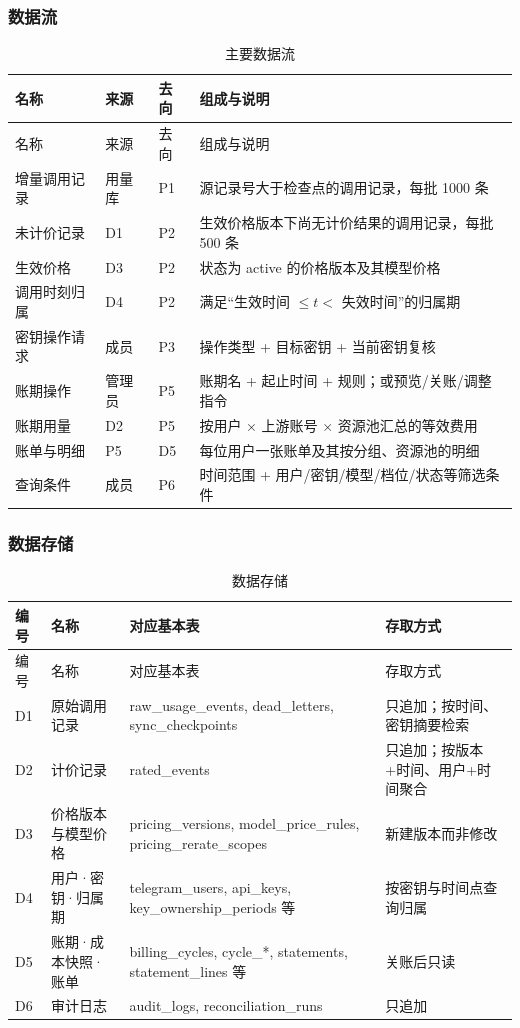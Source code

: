\subsubsection{数据流}

\begin{longtable}{@{}p{}p{}p{}p{}@{}}
\caption{主要数据流}\\
\toprule 名称 & 来源 & 去向 & 组成与说明 \\ \midrule\endfirsthead
\toprule 名称 & 来源 & 去向 & 组成与说明 \\ \midrule\endhead
增量调用记录 & 用量库 & P1 & 源记录号大于检查点的调用记录，每批 1000 条 \\
未计价记录 & D1 & P2 & 生效价格版本下尚无计价结果的调用记录，每批 500 条 \\
生效价格 & D3 & P2 & 状态为 active 的价格版本及其模型价格 \\
调用时刻归属 & D4 & P2 & 满足“生效时间 $\le t <$ 失效时间”的归属期 \\
密钥操作请求 & 成员 & P3 & 操作类型 + 目标密钥 + 当前密钥复核 \\
账期操作 & 管理员 & P5 & 账期名 + 起止时间 + 规则；或预览/关账/调整指令 \\
账期用量 & D2 & P5 & 按用户 × 上游账号 × 资源池汇总的等效费用 \\
账单与明细 & P5 & D5 & 每位用户一张账单及其按分组、资源池的明细 \\
查询条件 & 成员 & P6 & 时间范围 + 用户/密钥/模型/档位/状态等筛选条件 \\
\bottomrule
\end{longtable}

\subsubsection{数据存储}

\begin{longtable}{@{}p{}p{}p{}p{}@{}}
\caption{数据存储}\\
\toprule 编号 & 名称 & 对应基本表 & 存取方式 \\ \midrule\endfirsthead
\toprule 编号 & 名称 & 对应基本表 & 存取方式 \\ \midrule\endhead
D1 & 原始调用记录 & raw\_usage\_events, dead\_letters, sync\_checkpoints & 只追加；按时间、密钥摘要检索 \\
D2 & 计价记录 & rated\_events & 只追加；按版本+时间、用户+时间聚合 \\
D3 & 价格版本与模型价格 & pricing\_versions, model\_price\_rules, pricing\_rerate\_scopes & 新建版本而非修改 \\
D4 & 用户·密钥·归属期 & telegram\_users, api\_keys, key\_ownership\_periods 等 & 按密钥与时间点查询归属 \\
D5 & 账期·成本快照·账单 & billing\_cycles, cycle\_*, statements, statement\_lines 等 & 关账后只读 \\
D6 & 审计日志 & audit\_logs, reconciliation\_runs & 只追加 \\
\bottomrule
\end{longtable}

